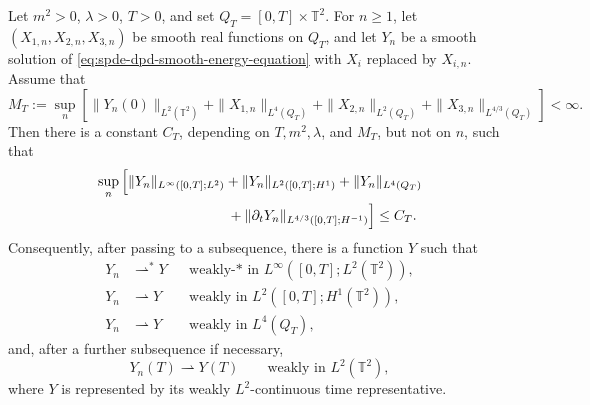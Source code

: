 \begin{proposition}
\label{prop:spde-dpd-energy-compactness}
Let \(m^2>0\), \(\lambda>0\), \(T>0\), and set
\(Q_T=[0,T]\times\mathbb T^2\).  For \(n\geq1\), let
\((X_{1,n},X_{2,n},X_{3,n})\) be smooth real functions on \(Q_T\), and let
\(Y_n\) be a smooth solution of
\eqref{eq:spde-dpd-smooth-energy-equation} with \(X_i\) replaced by
\(X_{i,n}\).  Assume that
\[
  M_T:=
  \sup_n
  \left[
    \|Y_n(0)\|_{L^2(\mathbb T^2)}
    +\|X_{1,n}\|_{L^4(Q_T)}
    +\|X_{2,n}\|_{L^2(Q_T)}
    +\|X_{3,n}\|_{L^{4/3}(Q_T)}
  \right]
  <\infty .
\]
Then there is a constant \(C_T\), depending on
\(T,m^2,\lambda\), and \(M_T\), but not on \(n\), such that
\begin{align}
  \sup_n
  \Big[
    &\|Y_n\|_{L^\infty([0,T];L^2)}
     +\|Y_n\|_{L^2([0,T];H^1)}
     +\|Y_n\|_{L^4(Q_T)}
  \notag\\
    &\hspace{2.5cm}
     +\|\partial_tY_n\|_{L^{4/3}([0,T];H^{-1})}
  \Big]
  \leq C_T .
  \label{eq:spde-dpd-energy-compactness-bound}
\end{align}
Consequently, after passing to a subsequence, there is a function \(Y\) such
that
\[
\begin{aligned}
  Y_n&\rightharpoonup^\ast Y
    &&\text{weakly-* in }L^\infty([0,T];L^2(\mathbb T^2)),\\
  Y_n&\rightharpoonup Y
    &&\text{weakly in }L^2([0,T];H^1(\mathbb T^2)),\\
  Y_n&\rightharpoonup Y
    &&\text{weakly in }L^4(Q_T),
\end{aligned}
\]
and, after a further subsequence if necessary,
\[
  Y_n(T)\rightharpoonup Y(T)
  \qquad\text{weakly in }L^2(\mathbb T^2),
\]
where \(Y\) is represented by its weakly \(L^2\)-continuous time
representative.
\end{proposition}

